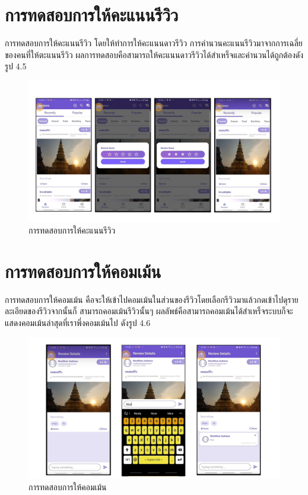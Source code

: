 \section{การทดสอบการให้คะแนนรีวิว}
การทดสอบการให้คะแนนรีวิว โดยให้ทำการให้คะแนนดาวรีวิว การคำนวนคะแนนรีวิวมาจากการเฉลี่ยของคนที่ให้ตะแนนรีวิว
ผลการทดสอบคือสามารถให้คะแนนดาวรีวิวได้สำเหร็จและคำนวนได้ถูกต้องดังรูป 4.5
\begin{figure}
    \begin{center}
      \includegraphics[width=1\textwidth]{./image/testing/Slide6.JPG}
    \end{center}
    \caption[การทดสอบการให้คะแนนรีวิว]{การทดสอบการให้คะแนนรีวิว}
    \end{figure}

\section{การทดสอบการให้คอมเม้น}
การทดสอบการให้คอมเม้น คือจะให้เข้าไปคอมเม้นในส่วนของรีวิวโดยเลือกรีวิวมาแล้วกดเข้าไปดุรายละเอียดของรีวิวจากนั้นก็
สามารถคอมเม้นรีวิวนั้นๆ ผลลัพธ์คือสามารถคอมเม้นได้สำเหร็จระบบก็จะแสดงคอมเม้นล่าสุดที่เราพึ่งคอมเม้นไป ดังรูป 4.6 

\begin{figure}
    \begin{center}
      \includegraphics[width=1\textwidth]{./image/testing/Slide7.JPG}
    \end{center}
    \caption[การทดสอบการให้คอมเม้น]{การทดสอบการให้คอมเม้น}
    \end{figure}

